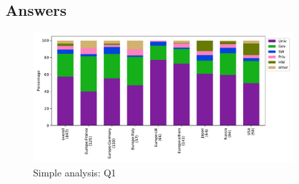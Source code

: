 
\subsection{Answers}


\begin{figure}[htb]
\begin{center}
\includegraphics[width=10cm]{../pdfs/Q1.pdf}
\caption{Simple analysis: Q1}
\label{fig:Q1}
\end{center}
\end{figure}

